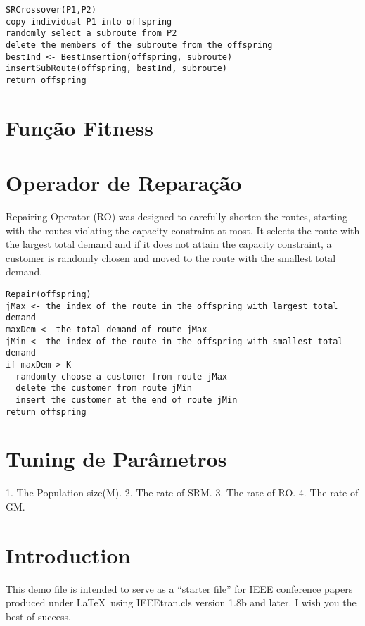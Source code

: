 \documentclass[conference]{IEEEtran}
\begin{document}
\begin{verbatim}
SRCrossover(P1,P2)
copy individual P1 into offspring
randomly select a subroute from P2
delete the members of the subroute from the offspring
bestInd <- BestInsertion(offspring, subroute)
insertSubRoute(offspring, bestInd, subroute)
return offspring
\end{verbatim}

\section{Função Fitness}

\section{Operador de Reparação}
Repairing Operator (RO) was designed to carefully shorten the routes, starting with the routes violating the capacity constraint at most. It selects the route with the largest total demand and if it does not attain the capacity constraint, a customer is randomly chosen and moved to the route with the smallest total demand.

\begin{verbatim}
Repair(offspring)
jMax <- the index of the route in the offspring with largest total demand
maxDem <- the total demand of route jMax 
jMin <- the index of the route in the offspring with smallest total demand
if maxDem > K
  randomly choose a customer from route jMax
  delete the customer from route jMin
  insert the customer at the end of route jMin
return offspring
\end{verbatim}

\section{Tuning de Parâmetros}
1. The Population size(M).
2. The rate of SRM.
3. The rate of RO.
4. The rate of GM.

%
\IEEEpeerreviewmaketitle



\section{Introduction}
This demo file is intended to serve as a ``starter file''
for IEEE conference papers produced under \LaTeX\ using
IEEEtran.cls version 1.8b and later.
I wish you the best of success.
\end{document}

